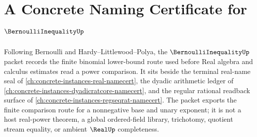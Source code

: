 \chapter{A Concrete Naming Certificate for $\BernoulliInequalityUp$}
\label{ch:concrete-instances-bernoulli-inequality-namecert}

Following Bernoulli and Hardy--Littlewood--Polya, the $\BernoulliInequalityUp$ packet records the finite binomial lower-bound route used before Real algebra and calculus estimates read a power comparison. It sits beside the terminal real-name seal of \autoref{ch:concrete-instances-real-namecert}, the dyadic arithmetic ledger of \autoref{ch:concrete-instances-dyadicratcore-namecert}, and the regular rational readback surface of \autoref{ch:concrete-instances-regseqrat-namecert}. The packet exports the finite comparison route for a nonnegative base and unary exponent; it is not a host real-power theorem, a global ordered-field library, trichotomy, quotient stream equality, or ambient $\RealUp$ completeness.

